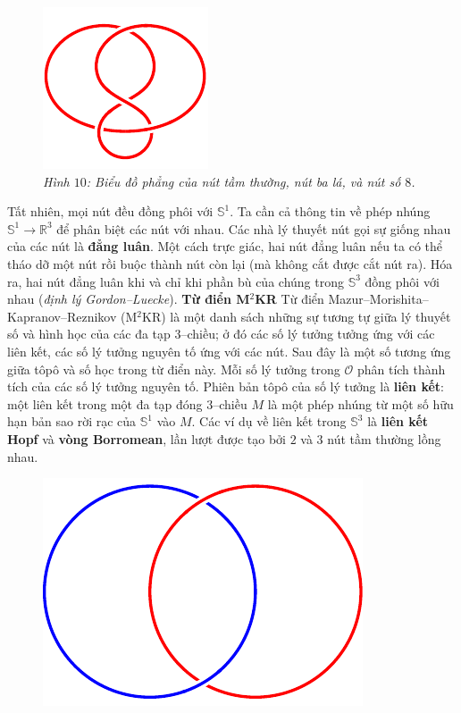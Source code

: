 \begin{multicols}{2}
\begin{figure}[H]
		\includegraphics[width= 0.28\linewidth]{figure 8.pdf}
		\caption{\small\textit{\color{duongvaotoanhoc}Hình $10$: Biểu đồ phẳng của nút tầm thường, nút ba lá, và nút số $8$.}}
		\vspace*{-10pt}
	\end{figure}
	Tất nhiên, mọi nút đều đồng phôi với $\mathbb{S}^1$. Ta cần cả thông tin về phép nhúng $\mathbb{S}^1 \to \mathbb{R}^3$ để phân biệt các nút với nhau. Các nhà lý thuyết nút gọi sự giống nhau của các nút là {\bf\color{duongvaotoanhoc} đẳng luân}. Một cách trực giác, hai nút đẳng luân nếu ta có thể tháo dỡ một nút rồi buộc thành nút còn lại (mà không cắt được cắt nút ra). Hóa ra, hai nút đẳng luân khi và chỉ khi phần bù của chúng trong $\mathbb{S}^3$ đồng phôi với nhau ({\it định lý Gordon--Luecke}).
	\vskip 0.1cm
	\textbf{\color{duongvaotoanhoc}Từ điển M$^2$KR}
	\vskip 0.1cm
	Từ điển Mazur--Morishita--Kapranov--Reznikov (M$^2$KR) là một danh sách những sự tương tự giữa lý thuyết số và hình học của các đa tạp $3$--chiều; ở đó các số lý tưởng tưởng ứng với các liên kết, các số lý tưởng nguyên tố ứng với các nút. Sau đây là một số tương ứng giữa tôpô và số học trong từ điển này.
	\vskip 0.1cm
	Mỗi số lý tưởng trong $\mathcal{O}$ phân tích thành tích của các số lý tưởng nguyên tố. Phiên bản tôpô của số lý tưởng là {\bf\color{duongvaotoanhoc} liên kết}: một liên kết trong một đa tạp đóng $3$--chiều $M$ là một phép nhúng từ một số hữu hạn bản sao rời rạc của $\mathbb{S}^1$ vào $M$. Các ví dụ về liên kết trong $\mathbb{S}^3$ là {\bf\color{duongvaotoanhoc} liên kết Hopf} và {\bf\color{duongvaotoanhoc} vòng Borromean}, lần lượt được tạo bởi $2$ và $3$ nút tầm thường lồng nhau.
	\begin{figure}[H]
		\vspace*{-15pt}
		\centering
		\captionsetup{labelformat= empty, justification=centering}
		\includegraphics[width= 0.4\linewidth]{hopf.pdf}\quad\quad

\end{figure}
\end{multicols}
